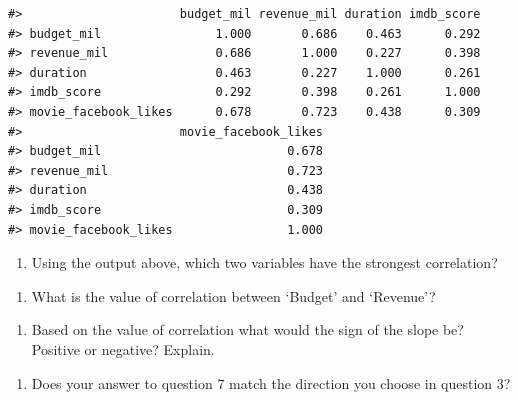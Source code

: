\documentclass[
]{report}
\providecommand{\tightlist}{%
  \setlength{\itemsep}{0pt}\setlength{\parskip}{0pt}}
\begin{document}
\begin{verbatim}
#>                      budget_mil revenue_mil duration imdb_score
#> budget_mil                1.000       0.686    0.463      0.292
#> revenue_mil               0.686       1.000    0.227      0.398
#> duration                  0.463       0.227    1.000      0.261
#> imdb_score                0.292       0.398    0.261      1.000
#> movie_facebook_likes      0.678       0.723    0.438      0.309
#>                      movie_facebook_likes
#> budget_mil                          0.678
#> revenue_mil                         0.723
#> duration                            0.438
#> imdb_score                          0.309
#> movie_facebook_likes                1.000
\end{verbatim}

\begin{enumerate}
\def\labelenumi{\arabic{enumi}.}
\setcounter{enumi}{4}
\tightlist
\item
  Using the output above, which two variables have the strongest correlation?
\end{enumerate}

\vspace{0.3in}

\begin{enumerate}
\def\labelenumi{\arabic{enumi}.}
\setcounter{enumi}{5}
\tightlist
\item
  What is the value of correlation between `Budget' and `Revenue'?
\end{enumerate}

\vspace{0.3in}

\begin{enumerate}
\def\labelenumi{\arabic{enumi}.}
\setcounter{enumi}{6}
\tightlist
\item
  Based on the value of correlation what would the sign of the slope be? Positive or negative? Explain.
\end{enumerate}

\vspace{0.5in}

\begin{enumerate}
\def\labelenumi{\arabic{enumi}.}
\setcounter{enumi}{7}
\tightlist
\item
  Does your answer to question 7 match the direction you choose in question 3?
\end{enumerate}

\vspace{0.2in}
\end{document}
